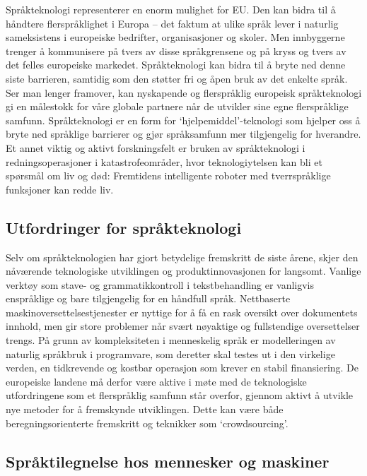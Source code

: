 \begin{multicols}{2}

Språkteknologi representerer en enorm mulighet for EU. Den kan bidra til å håndtere flerspråklighet i Europa -- det faktum at ulike språk lever i naturlig sameksistens i europeiske bedrifter, organisasjoner og skoler. Men innbyggerne trenger å kommunisere på tvers av disse språkgrensene og på kryss og tvers av det felles europeiske markedet. Språkteknologi kan bidra til å bryte ned denne siste barrieren, samtidig som den støtter fri og åpen bruk av det enkelte språk. Ser man lenger framover, kan nyskapende og flerspråklig europeisk språkteknologi gi en målestokk for våre globale partnere når de utvikler sine egne flerspråklige samfunn. Språkteknologi er en form for `hjelpemiddel'-teknologi som hjelper oss å bryte ned språklige barrierer og gjør språksamfunn mer tilgjengelig for hverandre. Et annet viktig og aktivt forskningsfelt er bruken av språkteknologi i redningsoperasjoner i katastrofeområder, hvor teknologiytelsen kan bli et spørsmål om liv og død: Fremtidens intelligente roboter med tverrspråklige funksjoner kan redde liv.

\subsection{Utfordringer for språkteknologi}

Selv om språkteknologien har gjort betydelige fremskritt de siste årene, skjer den nåværende teknologiske utviklingen og produktinnovasjonen for langsomt. Vanlige verktøy som stave- og grammatikkontroll i tekstbehandling er vanligvis enspråklige og bare tilgjengelig for en håndfull språk. Nettbaserte maskinoversettelsestjenester er nyttige for å få en rask oversikt over dokumentets innhold, men gir store problemer når svært nøyaktige og fullstendige oversettelser trengs. På grunn av kompleksiteten i menneskelig språk er modelleringen av naturlig språkbruk i programvare, som deretter skal testes ut i den virkelige verden, en tidkrevende og kostbar operasjon  som krever en stabil finansiering. De europeiske landene må derfor være aktive i møte med de teknologiske utfordringene som et flerspråklig samfunn står overfor, gjennom aktivt å utvikle nye metoder for å fremskynde utviklingen. Dette kan være  både beregningsorienterte fremskritt og teknikker som `crowdsourcing'.


\subsection{Språktilegnelse hos mennesker og maskiner}


\end{multicols}
